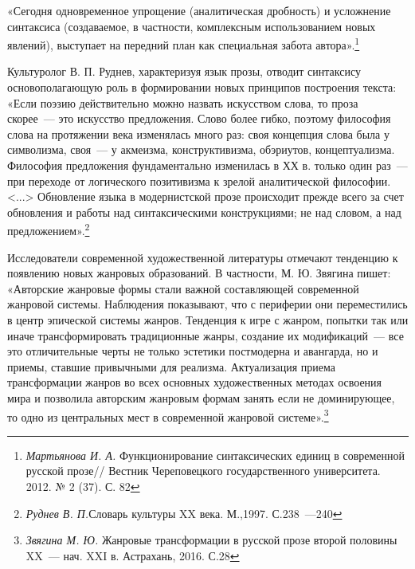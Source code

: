 \documentclass{kursa4}
\begin{document}
    {«Сегодня одновременное упрощение (аналитическая дробность) и усложнение синтаксиса (создаваемое, в частности, комплексным использованием новых явлений), выступает на передний план как специальная забота автора».}\footnote{\textit{Мартьянова И. А. }Функционирование синтаксических единиц в современной русской прозе// Вестник Череповецкого государственного университета. 2012. № 2 (37). С. 82}

    {Культуролог В. П. Руднев, характеризуя язык прозы, отводит синтаксису основополагающую роль в формировании новых принципов построения текста: «Если поэзию действительно можно назвать искусством слова, то проза скорее~--- это искусство предложения. Слово более гибко, поэтому философия слова на протяжении века изменялась
    много раз: своя концепция слова была у символизма, своя~--- у акмеизма, конструктивизма, обэриутов, концептуализма. Философия предложения фундаментально изменилась в ХХ в. только один раз~--- при переходе от
    логического позитивизма к зрелой аналитической философии.
    \textless{}...\textgreater{} Обновление языка в модернистской прозе
    происходит прежде всего за счет обновления и работы над
    синтаксическими конструкциями; не над словом, а над
    предложением».}\footnote{\textit{Руднев В. П.}Словарь культуры XX века. М.,1997. С.238~---240}

    Исследователи современной художественной литературы отмечают тенденцию к появлению новых жанровых образований. В частности, М. Ю. Звягина пишет: «Авторские жанровые формы стали важной составляющей современной жанровой системы. Наблюдения показывают, что с периферии они переместились в центр эпической системы жанров. Тенденция к игре с жанром, попытки так или иначе трансформировать традиционные жанры, создание их модификаций~--- все это отличительные черты не только эстетики постмодерна и авангарда, но и приемы, ставшие привычными для реализма. Актуализация приема трансформации жанров во всех основных художественных методах освоения мира и позволила авторским жанровым формам занять если не доминирующее, то одно из центральных мест в современной жанровой системе».\footnote{\textit{Звягина М. Ю. }{Жанровые трансформации в русской прозе второй половины XX~--- нач. XXI в. Астрахань, 2016. С.28}}
\end{document}
